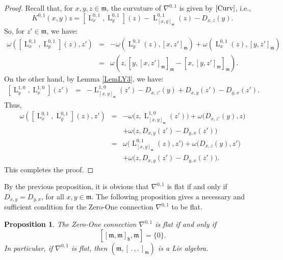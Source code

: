 \documentclass[preprint,12pt,1p]{elsarticle}
\theoremstyle{plain}
\newtheorem{proposition}[theorem]{Proposition}
\theoremstyle{definition}
\newcommand{\n}{\nabla}
\newcommand{\nc}{\n^{0,1}}
\newcommand{\h}{\mathfrak{h}}
\newcommand{\m}{\mathfrak{m}}
\newcommand{\la}{\operatorname{L}^{0,1}}
\newcommand{\lm}{\operatorname{L}^{1,0}}
\numberwithin{equation}{section}
\begin{document}
\begin{proof}
Recall that, for $x,y,z\in\mathfrak{m}$, the curvature of $\nc$ is given by $\eqref{Curv}$, i.e.,
\begin{equation*}
K^{0,1}(x,y)z=\left[\la_x,\la_y\right](z)-\la_{[x,y]_\mathfrak{m}}(z)-D_{x,z}(y).
\end{equation*}
So, for $z'\in\mathfrak{m}$, we have:
\begin{eqnarray*}
\omega\left(\left[\la_x,\la_y\right](z),z'\right)&=&-\omega\left(\la_y(z),[x,z']_\mathfrak{m}\right)+\omega\left(\la_x(z),[y,z']_\mathfrak{m}\right)\\
&=&\omega\left(z,[y,[x,z']_\mathfrak{m}]_\mathfrak{m}-[x,[y,z']_\mathfrak{m}]_\mathfrak{m}\right).
\end{eqnarray*}
On the other hand, by Lemma \ref{LemLY3}, we have:
\begin{eqnarray*}
\left[\lm_y,\lm_x\right](z')&=&-\lm_{[x,y]_\m}(z')-D_{x,z'}(y)+D_{x,y}(z')-D_{y,x}(z').
\end{eqnarray*}
Thus,
\begin{eqnarray*}
\omega\left(\left[\la_x,\la_y\right](z),z'\right)&=&-\omega\Big(z,\lm_{[x,y]_\m}(z')\Big)+
\omega\Big(D_{x,z'}(y),z\Big)\\
&&+\omega\Big(z,D_{x,y}(z')-D_{y,x}(z')\Big)\\
&=&\omega\Big(\la_{[x,y]_\mathfrak{m}}(z),z'\Big)+\omega\Big(D_{x,z}(y),z'\Big)\\
&&+\omega\Big(z,D_{x,y}(z')-D_{y,x}(z')\Big).
\end{eqnarray*}
This completes the proof.
\end{proof}

By the previous proposition, it is obvious that $\nc$ is flat if and only if $D_{x,y}=D_{y,x}$, for all $x,y\in\mathfrak{m}$. The following proposition gives a necessary and sufficient condition for the Zero-One connection $\nc$ to be flat.

\begin{proposition}\label{NaFlt}
The Zero-One connection $\nc$ is flat if and only if $$[[\mathfrak{m},\mathfrak{m}]_\h,\mathfrak{m}]=\{0\}.$$
In particular, if $\nc$ is flat, then $(\mathfrak{m},[\,.\,,.\,]_\mathfrak{m})$ is a Lie algebra. 
\end{proposition}
\end{document}
